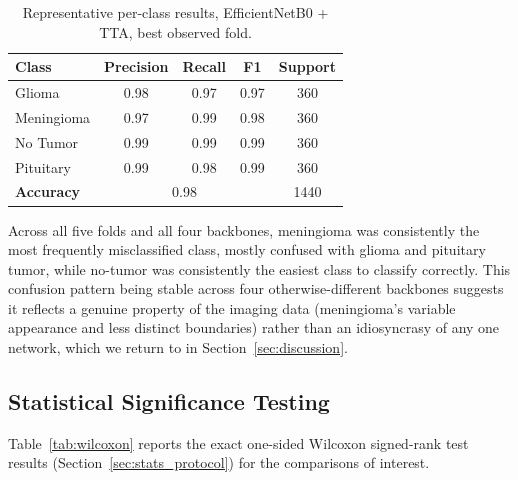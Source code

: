 \documentclass[11pt]{article}
\begin{document}
\begin{table}[htbp]
\centering
\caption{Representative per-class results, EfficientNetB0 + TTA, best observed fold.}
\label{tab:perclass}
\small
\begin{tabular}{@{}lcccc@{}}
\toprule
\textbf{Class} & \textbf{Precision} & \textbf{Recall} & \textbf{F1} & \textbf{Support} \\
\midrule
Glioma      & 0.98 & 0.97 & 0.97 & 360 \\
Meningioma  & 0.97 & 0.99 & 0.98 & 360 \\
No Tumor    & 0.99 & 0.99 & 0.99 & 360 \\
Pituitary   & 0.99 & 0.98 & 0.99 & 360 \\
\textbf{Accuracy} & \multicolumn{3}{c}{0.98} & 1440 \\
\bottomrule
\end{tabular}
\end{table}

Across all five folds and all four backbones, meningioma was consistently the most frequently misclassified class, mostly confused with glioma and pituitary tumor, while no-tumor was consistently the easiest class to classify correctly. This confusion pattern being stable across four otherwise-different backbones suggests it reflects a genuine property of the imaging data (meningioma's variable appearance and less distinct boundaries) rather than an idiosyncrasy of any one network, which we return to in Section~\ref{sec:discussion}.

\subsection{Statistical Significance Testing}
\label{sec:stats_results}

Table~\ref{tab:wilcoxon} reports the exact one-sided Wilcoxon signed-rank test results (Section~\ref{sec:stats_protocol}) for the comparisons of interest.
\end{document}
